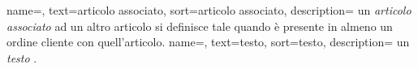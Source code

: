  {
    name=,
    text=articolo associato,
    sort=articolo associato,
    description={ un \emph{articolo associato} ad un altro articolo si definisce tale quando è presente in almeno un 
    ordine cliente con quell'articolo.
    }
}
 {
    name=,
    text=testo,
    sort=testo,
    description={ un \emph{testo} .
    }
}











